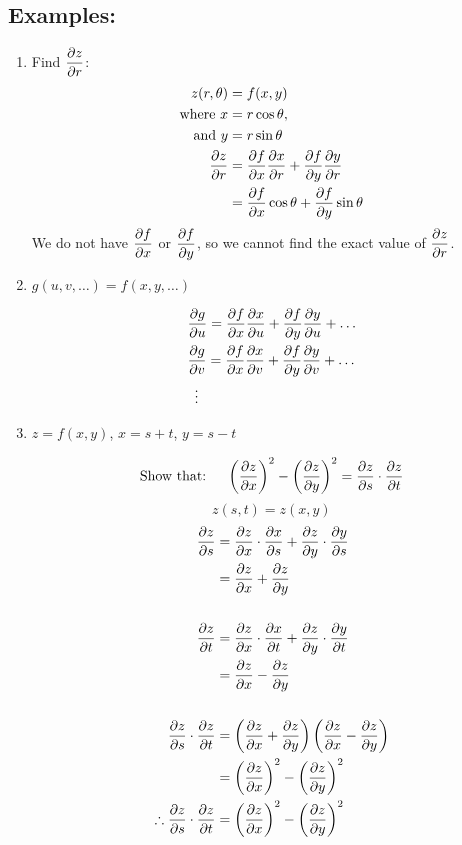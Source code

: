 \subsection{Examples:}

\begin{enumerate}
    
    \item Find $\pd{z}{r}$:
        \begin{align*}
        z(r,\theta) &= f(x, y)\\
        \text{where } x &= r\cos\theta,\\
        \text{ and } y &= r\sin\theta\\
        \pd{z}{r} &= \pd{f}{x}\pd{x}{r} + \pd{f}{y}\pd{y}{r}\\
        &= \pd{f}{x}\cos\theta + \pd{f}{y}\sin\theta
    \end{align*}
    We do not have $\pd{f}{x}$ or $\pd{f}{y}$, so we cannot find the exact value of $\pd{z}{r}$.

    \item $g(u, v, \ldots) = f(x, y, \ldots)$
    
    \begin{align*}
        &\pd{g}{u} = \pd{f}{x}\pd{x}{u} + \pd{f}{y}\pd{y}{u} + \ldots\\
        &\pd{g}{v} = \pd{f}{x}\pd{x}{v} + \pd{f}{y}\pd{y}{v} + \ldots\\
        &\,\,\,\vdots
    \end{align*}

    \item $z = f(x, y)$, $x = s + t$, $y = s - t$
    
        
        \[
            \text{Show that: }\quad \left(\pd{z}{x}\right)^2 - \left(\pd{z}{y}\right)^2 = \pd{z}{s} \cdot \pd{z}{t}
        \]
        \[
            z(s, t) = z(x, y)
        \]
        \begin{align*}
            \pd{z}{s} &= \pd{z}{x}\cdot\pd{x}{s} + \pd{z}{y}\cdot\pd{y}{s}\\
            &= \pd{z}{x} + \pd{z}{y}\\\\
            \pd{z}{t} &= \pd{z}{x}\cdot\pd{x}{t} + \pd{z}{y}\cdot\pd{y}{t}\\
            &= \pd{z}{x} - \pd{z}{y}\\\\
            \pd{z}{s}\cdot\pd{z}{t} &= \left(\pd{z}{x} + \pd{z}{y}\right)\left(\pd{z}{x} - \pd{z}{y}\right)\\
            &= \left(\pd{z}{x}\right)^2 - \left(\pd{z}{y}\right)^2\\
            \therefore \pd{z}{s}\cdot\pd{z}{t} &= \left(\pd{z}{x}\right)^2 - \left(\pd{z}{y}\right)^2
        \end{align*}

\end{enumerate}

